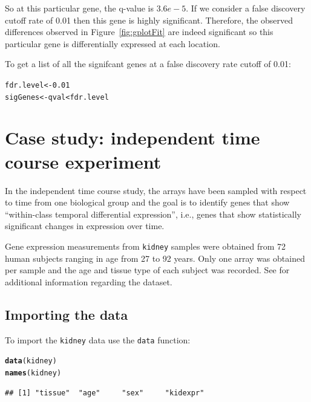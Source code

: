 \documentclass{article}\usepackage[]{graphicx}\usepackage[]{color}
\makeatletter
\newcommand{\hlnum}[1]{\textcolor[rgb]{0.686,0.059,0.569}{#1}}%
\newcommand{\hlopt}[1]{\textcolor[rgb]{0,0,0}{#1}}%
\newcommand{\hlstd}[1]{\textcolor[rgb]{0.345,0.345,0.345}{#1}}%
\newcommand{\hlkwb}[1]{\textcolor[rgb]{0.69,0.353,0.396}{#1}}%
\newcommand{\hlkwd}[1]{\textcolor[rgb]{0.737,0.353,0.396}{\textbf{#1}}}%
\newenvironment{kframe}{%
 \def\at@end@of@kframe{}%
 \ifinner\ifhmode%
  \def\at@end@of@kframe{\end{minipage}}%
  \begin{minipage}{\columnwidth}%
 \fi\fi%
 \def\FrameCommand##1{\hskip\@totalleftmargin \hskip-\fboxsep
 \colorbox{shadecolor}{##1}\hskip-\fboxsep
     \hskip-\linewidth \hskip-\@totalleftmargin \hskip\columnwidth}%
 \MakeFramed {\advance\hsize-\width
   \@totalleftmargin\z@ \linewidth\hsize
   \@setminipage}}%
 {\par\unskip\endMakeFramed%
 \at@end@of@kframe}
\newenvironment{knitrout}{}{} %
\makeatother
\begin{document}
So at this particular gene, the q-value is $3.6e-5$. If we consider a false discovery cutoff rate of 0.01 then this gene is highly significant. Therefore, the observed differences observed in Figure~\ref{fig:gplotFit} are indeed significant so this particular gene is differentially expressed at each location. 

To get a list of all the signifcant genes at a false discovery rate cutoff of 0.01:
\begin{knitrout}
\color{fgcolor}\begin{kframe}
\begin{alltt}
\hlstd{fdr.level} \hlkwb{<-} \hlnum{0.01}
\hlstd{sigGenes} \hlkwb{<-} \hlstd{qval} \hlopt{<} \hlstd{fdr.level}
\end{alltt}
\end{kframe}
\end{knitrout}

\section{Case study: independent time course experiment}
\label{sec:kidney}
In the independent time course study, the arrays have been sampled with respect to time from one biological group and the goal is to identify genes that show ``within-class temporal differential expression'', i.e., genes that show statistically significant changes in expression over time.

Gene expression measurements from {\tt kidney} samples were obtained from 72 human subjects ranging in age from 27 to 92 years. Only one array was obtained per sample and the age and tissue type of each subject was recorded. See \cite{rodwell:2004} for additional information regarding the dataset.

\subsection{Importing the data}
To import the {\tt kidney} data use the {\tt data} function:
\begin{knitrout}
\color{fgcolor}\begin{kframe}
\begin{alltt}
\hlkwd{data}\hlstd{(kidney)}
\hlkwd{names}\hlstd{(kidney)}
\end{alltt}
\begin{verbatim}
## [1] "tissue"  "age"     "sex"     "kidexpr"
\end{verbatim}
\end{kframe}
\end{knitrout}
\end{document}
